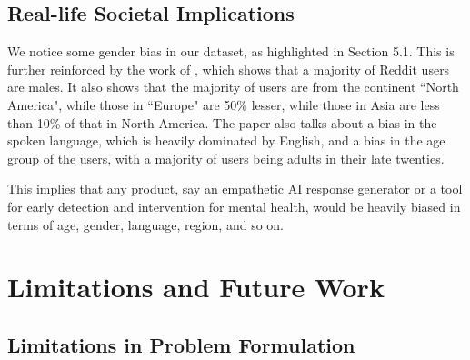 \documentclass[conference,compsoc]{IEEEtran}
\begin{document}
\subsection{Real-life Societal Implications}

We notice some gender bias in our dataset, as highlighted in Section 5.1. This is further reinforced by the work of \citet{Gjurkovic+21:reddit-stat}, which shows that a majority of Reddit users are males. It also shows that the majority of users are from the continent ``North America", while those in ``Europe" are 50\% lesser, while those in Asia are less than 10\% of that in North America. The paper also talks about a bias in the spoken language, which is heavily dominated by English, and a bias in the age group of the users, with a majority of users being adults in their late twenties. 

This implies that any product, say an empathetic AI response generator or a tool for early detection and intervention for mental health, would be heavily biased in terms of age, gender, language, region, and so on. 

\section{Limitations and Future Work} \label{limitaion}

\subsection{Limitations in Problem Formulation}
\end{document}
